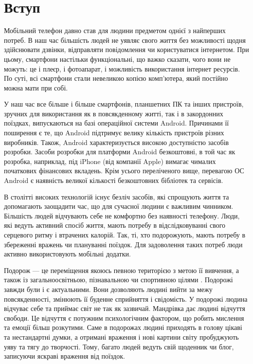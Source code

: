 \documentclass[../main.tex]{subfiles}
\begin{document}
\chapter*{Вступ}

Мобільний телефон давно став для людини предметом однієї з найперших потреб. В наш час більшість людей не уявляє свого життя без можливості щодня здійснювати дзвінки, відправляти повідомлення чи користуватися інтернетом. При цьому, смартфони настільки функціональні, що важко сказати, чого вони не можуть: це і плеєр, і фотоапарат, і можливість використання інтернет ресурсів. По суті, всі смартфони стали невеликою копією комп'ютера, який постійно можна мати при собі.

У наш час все більше і більше смартфонів, планшетних ПК та інших пристроїв, зручних для використання як в повсякденному житті, так і в закордонних поїздках, випускаються на базі операційної системи Android. Причинами її поширення є те, що Android підтримує велику кількість пристроїв різних виробників. Також, Android характеризується високою доступністю засобів розробки. Засоби розробки для платформи Android безкоштовні, в той час як розробка, наприклад, під iPhone (від компанії Apple) вимагає чималих початкових фінансових вкладень. Крім усього переліченого вище, перевагою ОС Android є наявність великої кількості безкоштовних бібліотек та сервісів.

В столітті високих технологій існує безліч засобів, які спрощують життя та допомагають заощадити час, що для сучасної людини є важливим чинником. Більшість людей відчувають себе не комфортно без наявності телефону. Люди, які ведуть активний спосіб життя, мають потребу в відслідковуванні свого серцевого ритму і втрачених калорій. Так, ті, хто подорожують, мають потребу в збереженні вражень чи плануванні поїздок. Для задоволення таких потреб люди активно використовують мобільні додатки.

Подорож — це переміщення якоюсь певною територією з метою її вивчення, а також із загальноосвітньою, пізнавальною чи спортивною цілями \cite{travel}. Подорожі завжди були і є актуальними. Вони дозволяють людині вийти за межу повсякденності, змінюють її буденне сприйняття і свідомість. У подорожі людина відчуває себе та приймає світ не так як зазвичай. Мандрівка дає людині відчуття свободи. Це відчуття є потужним психологічним фактором, що робить мислення та емоції більш розкутими. Саме в подорожах людині приходять в голову цікаві та нестандартні думки, а отримані враження і нові картини світу пробуджують уяву та тягу до творчості. Тому, багато людей ведуть свій щоденник чи блог, записуючи яскраві враження від поїздок. 
\end{document}
